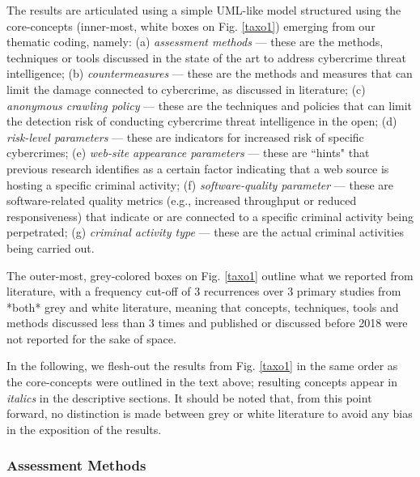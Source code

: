 The results are articulated using a simple UML-like model structured using the core-concepts (inner-most, white boxes on Fig. \ref{taxo1}) emerging from our thematic coding, namely: (a) \emph{assessment methods} --- these are the methods, techniques or tools discussed in the state of the art to address cybercrime threat intelligence; (b) \emph{countermeasures} --- these are the methods and measures that can limit the damage connected to cybercrime, as discussed in literature; (c) \emph{anonymous crawling policy} --- these are the techniques and policies that can limit the detection risk of conducting cybercrime threat intelligence in the open; (d) \emph{risk-level parameters} --- these are indicators for increased risk of specific cybercrimes; (e) \emph{web-site appearance parameters} --- these are ``hints" that previous research identifies as a certain factor indicating that a web source is hosting a specific criminal activity; (f) \emph{software-quality parameter} --- these are software-related quality metrics (e.g., increased throughput or reduced responsiveness) that indicate or are connected to a specific criminal activity being perpetrated; (g) \emph{criminal activity type} --- these are the actual criminal activities being carried out.

The outer-most, grey-colored boxes on Fig. \ref{taxo1} outline what we reported from literature, with a frequency cut-off of 3 recurrences over 3 primary studies from *both* grey and white literature, meaning that concepts, techniques, tools and methods discussed less than 3 times and published or discussed before 2018 were not reported for the sake of space. 

In the following, we flesh-out the results from Fig. \ref{taxo1} in the same order as the core-concepts were outlined in the text above; resulting concepts appear in \emph{italics} in the descriptive sections. It should be noted that, from this point forward, no distinction is made between grey or white literature to avoid any bias in the exposition of the results.

\subsubsection{Assessment Methods}

